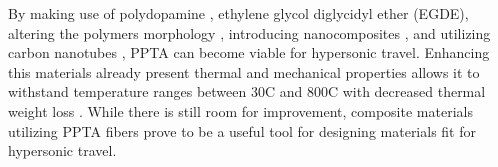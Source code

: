 \documentclass[12pt]{article}
\begin{document}
\begin{multicols}{2}
\indent By making use of polydopamine \citep{}, ethylene glycol diglycidyl ether (EGDE)\citep{LeiWang2017}, altering the polymers morphology \citep{Kanbargi2017}, introducing nanocomposites \citep{BoZhang2021}, and utilizing carbon nanotubes \citep{Yang2019}, PPTA can become viable for hypersonic travel. Enhancing this materials already present thermal and mechanical properties allows it to withstand temperature ranges between 30\degree C and 800\degree C with decreased thermal weight loss \citep{ShushengChen2014}. While there is still room for improvement, composite materials utilizing PPTA fibers prove to be a useful tool for designing materials fit for hypersonic travel.

\end{multicols}

\newpage 


 
\end{document}
